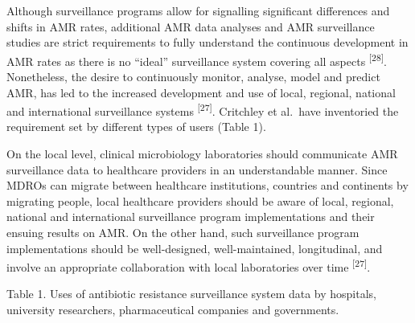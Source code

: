 \documentclass[
]{book}
\begin{document}
Although surveillance programs allow for signalling significant differences and shifts in AMR rates, additional AMR data analyses and AMR surveillance studies are strict requirements to fully understand the continuous development in AMR rates as there is no ``ideal'' surveillance system covering all aspects \textsuperscript{{[}28{]}}. Nonetheless, the desire to continuously monitor, analyse, model and predict AMR, has led to the increased development and use of local, regional, national and international surveillance systems \textsuperscript{{[}27{]}}. Critchley et al.~have inventoried the requirement set by different types of users (Table 1).

On the local level, clinical microbiology laboratories should communicate AMR surveillance data to healthcare providers in an understandable manner. Since MDROs can migrate between healthcare institutions, countries and continents by migrating people, local healthcare providers should be aware of local, regional, national and international surveillance program implementations and their ensuing results on AMR. On the other hand, such surveillance program implementations should be well-designed, well-maintained, longitudinal, and involve an appropriate collaboration with local laboratories over time \textsuperscript{{[}27{]}}.

Table 1. Uses of antibiotic resistance surveillance system data by hospitals, university researchers, pharmaceutical companies and governments.
\end{document}
